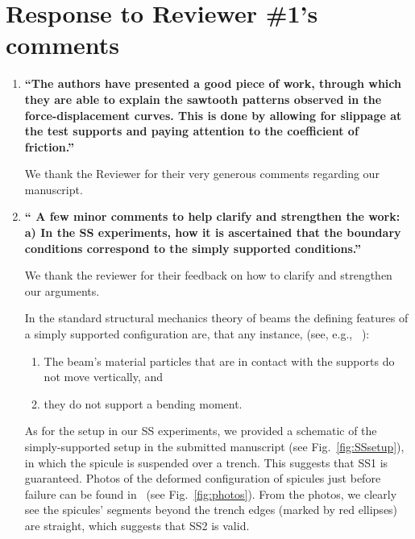 \documentclass[11pt,letterpaper]{report}
\begin{document}
\clearpage
\section*{Response to Reviewer \#1's comments}
\label{rev1}

\begin{enumerate}[label=\textit{1.\arabic*},wide, labelwidth=!, labelindent=0pt]

\item \label{r1c1} {\bf ``The authors have presented a good piece of work, through which they are able to explain the sawtooth patterns observed in the force-displacement curves. This is done by allowing for slippage at the test supports and paying attention to the coefficient of friction.''}



We thank the Reviewer for their very generous comments regarding our manuscript.

\newpage
\item \label{r1c2} {\bf `` A few minor comments to help clarify and strengthen the work: a) In the SS experiments, how it is ascertained that the boundary conditions correspond to the simply supported conditions.''}


We thank the reviewer for their feedback on how to clarify and strengthen our arguments.

In the standard structural mechanics theory of beams the defining features of a simply supported configuration are, that any instance, (see, e.g., ~\cite{gere1997mechanics}):
\begin{enumerate}[label=\textit{(SS\arabic*).},leftmargin = 1.5 cm]
\item The beam's material particles that are in contact with the supports do not move vertically, and
\item they do not support a bending moment.
\end{enumerate}


As for the setup in our SS experiments, we provided a schematic of the simply-supported setup in the submitted manuscript (see Fig.~\ref{fig:SSsetup}), in which the spicule is suspended over a trench. This suggests that SS1 is guaranteed. Photos of the deformed configuration of spicules just before failure can be found in~\cite{monn2017enhanced} (see Fig.~\ref{fig:photos}). From the photos, we clearly see the spicules' segments beyond the trench edges (marked by red ellipses) are straight, which suggests that SS2 is valid.


\end{enumerate}
\end{document}
